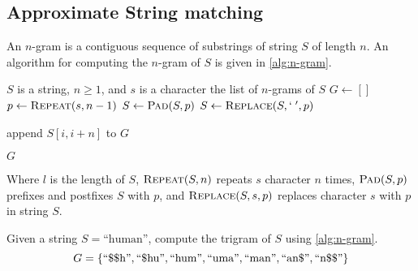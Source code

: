 	\subsection{Approximate String matching}
	\label{sec:n-gram}
		\begin{defn}[N-Gram]
			An \(n\)-gram is a contiguous sequence of substrings of string \(S\) of length \(n\).	 An algorithm for computing the \(n\)-gram of \(S\) is given in \vref{alg:n-gram}. 
		\end{defn}
		

		\begin{algorithm}[!ht]
			\caption{\(\textsc{N-Gram}(S, n, s)\)}
			\label{alg:n-gram}
			
			\begin{singlespaced}
				\begin{algorithmic}[1]
					\REQUIRE \(S\) is a string, \(n \ge 1\), and \(s\) is a character
					\ENSURE the list of \(n\)-grams of \(S\)
					\medskip
					\STATE \(G \leftarrow []\)\label{alg:n-gram:G}
					\STATE \(p \leftarrow \textsc{Repeat}(s, n - 1)\)
					\STATE \(S \leftarrow \textsc{Pad}(S, p)\)
					\STATE \(S \leftarrow \textsc{Replace}(S, `\;', p)\)\label{alg:n-gram:S}
					
						\STATE append \(S[i, i + n]\) to \(G\)
					\ENDFOR
					
					\RETURN \(G\)
					\medskip
					\medskip
				\end{algorithmic}
			\end{singlespaced}
		\end{algorithm}
		
		
		Where \(l\) is the length of \(S\), \(\textsc{Repeat}(S, n)\) repeats \(s\) character \(n\) times, \(\textsc{Pad}(S, p)\) prefixes and postfixes \(S\) with \(p\), and \(\textsc{Replace}(S, s, p)\) replaces character \(s\) with \(p\) in string \(S\).
		
		\begin{ex}
		\label{ex:ngram}
			Given a string \(S = \text{``human''}\), compute the trigram of \(S\) using \vref{alg:n-gram}.
			\[
				G = \{
					\text{``\char"24\char"24h''},
					\text{``\char"24hu''},
					\text{``hum''},
					\text{``uma''},
					\text{``man''},
					\text{``an\char"24''},
					\text{``n\char"24\char"24''}
				\}
			\]
		\end{ex}
		
